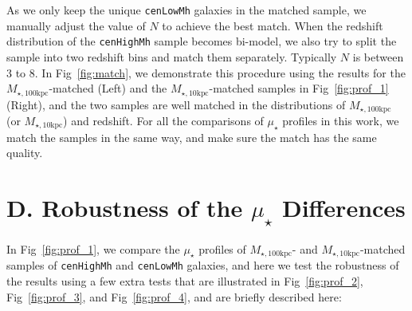 \documentclass[a4paper,fleqn,usenatbib]{mnras}
\def\rbcg{\texttt{cenHighMh}}
\def\nbcg{\texttt{cenLowMh}}
\def\minn{{$M_{\star,10\mathrm{kpc}}$}}
\def\mtot{{$M_{\star,100\mathrm{kpc}}$}}
\def\mden{{$\mu_{\star}$}}
\begin{document}
    As we only keep the unique \nbcg{} galaxies in the matched sample, we manually 
    adjust the value of $N$ to achieve the best match. 
    When the redshift distribution of the \rbcg{} sample becomes bi-model, we also try 
    to split the sample into two redshift bins and match them separately. 
    Typically $N$ is between 3 to 8.
    In Fig~\ref{fig:match}, we demonstrate this procedure using the results for 
    the \mtot{}-matched (Left) and the \minn{}-matched samples in Fig~\ref{fig:prof_1}
    (Right), and the two samples are well matched in the distributions of \mtot{}
    (or \minn{}) and redshift.  
    For all the comparisons of \mden{} profiles in this work, we match the samples 
    in the same way, and make sure the match has the same quality. 

    
\section{D. Robustness of the \mden{} Differences} 
	\label{app:robust}
    
    In Fig~\ref{fig:prof_1}, we compare the \mden{} profiles of \mtot{}- and 
    \minn{}-matched samples of \rbcg{} and \nbcg{} galaxies, and here we test the 
    robustness of the results using a few extra tests that are illustrated in
    Fig~\ref{fig:prof_2}, Fig~\ref{fig:prof_3}, and Fig~\ref{fig:prof_4}, and 
    are briefly described here:   
    
\end{document}
